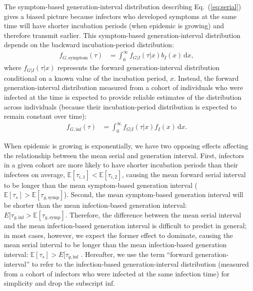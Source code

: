 \documentclass[12pt]{article}
\newcommand{\eref}[1]{Eq.~(\ref{eq:#1})}
\newcommand{\dd}[1]{\ensuremath{\, \mathrm{d}#1}}
\newcommand{\dx}{\dd{x}}
\begin{document}
The symptom-based generation-interval distribution describing \eref{serial} gives a biased picture because infectors who developed symptoms at the same time will have shorter incubation periods (when epidemic is growing) and therefore transmit earlier.
This symptom-based generation-interval distribution depends on the backward incubation-period distribution:
\begin{align}
f_{G, \mathrm{symptom}}(\tau) &= \int_0^\infty f_{G|I}(\tau|x) b_I(x) \dx,
\end{align}
where $f_{G|I}(\tau|x)$ represents the forward generation-interval distribution conditional on a known value of the incubation period, $x$.
Instead, the forward generation-interval distribution measured from a cohort of individuals who were infected at the time is expected to provide reliable estimates of the distribution across individuals (because their incubation-period distribution is expected to remain constant over time):
\begin{align}
f_{G, \mathrm{inf}}(\tau) &= \int_0^\infty f_{G|I}(\tau|x) f_I(x) \dx.
\end{align}

When epidemic is growing is exponentially, we have two opposing effects affecting the relationship between the mean serial and generation interval.
First, infectors in a given cohort are more likely to have shorter incubation periods than their infectees on average, $\mathbb E[\tau_{i, 1}] < \mathbb E[\tau_{i, 2}]$, causing the mean forward serial interval to be longer than the mean symptom-based generation interval ($\mathbb E[\tau_s] > \mathbb E[\tau_{g, \mathrm{symp}}]$).
Second, the mean symptom-based generation interval will be shorter than the mean infection-based generation interval: $E[\tau_{g, \mathrm{inf}} > \mathbb E[\tau_{g, \mathrm{symp}}]$.
Therefore, the difference between the mean serial interval and the mean infection-based generation interval is difficult to predict in general; in most cases, however, we expect the former effect to dominate, causing the mean serial interval to be longer than the mean infection-based generation interval: $\mathbb E[\tau_s] > E[\tau_{g, \mathrm{inf}}$ \citep{park2021forward}.
Hereafter, we use the term ``forward generation-interval'' to refer to the infection-based generation-interval distribution (measured from a cohort of infectors who were infected at the same infection time) for simplicity and drop the subscript $\mathrm{inf}$.
\end{document}
